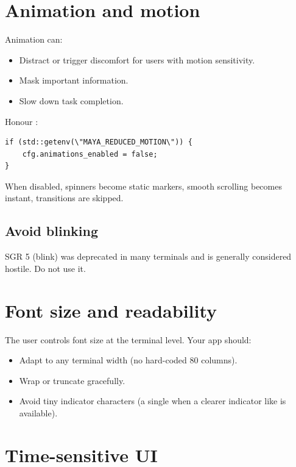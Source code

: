 \section{Animation and motion}

Animation can:

\begin{itemize}[leftmargin=*]
  \item Distract or trigger discomfort for users with motion
    sensitivity.
  \item Mask important information.
  \item Slow down task completion.
\end{itemize}

Honour :

\begin{lstlisting}
if (std::getenv(\"MAYA_REDUCED_MOTION\")) {
    cfg.animations_enabled = false;
}
\end{lstlisting}

When disabled, spinners become static markers, smooth scrolling
becomes instant, transitions are skipped.

\subsection*{Avoid blinking}

SGR 5 (blink) was deprecated in many terminals and is generally
considered hostile. Do not use it.

\section{Font size and readability}

The user controls font size at the terminal level. Your app
should:

\begin{itemize}[leftmargin=*]
  \item Adapt to any terminal width (no hard-coded 80 columns).
  \item Wrap or truncate gracefully.
  \item Avoid tiny indicator characters (a single 
    when a clearer indicator like \code{[done]} is available).
\end{itemize}

\section{Time-sensitive UI}

